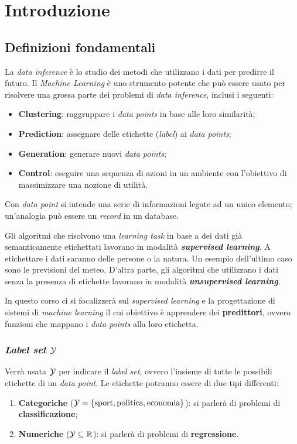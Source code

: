 \section{Introduzione}

\subsection{Definizioni fondamentali}

La \textit{data inference} è lo studio dei metodi che utilizzano i dati per predirre il futuro. 
Il \textit{Machine Learning} è uno strumento potente che può essere usato per risolvere una 
grossa parte dei problemi di \textit{data inference}, inclusi i seguenti:
\begin{itemize}
    \item \textbf{Clustering}: raggruppare i \textit{data points} in base alle loro similarità;
    \item \textbf{Prediction}: assegnare delle etichette (\textit{label}) ai \textit{data points};
    \item \textbf{Generation}: generare nuovi \textit{data points};
    \item    \textbf{Control}: eseguire una sequenza di azioni in un ambiente con l'obiettivo di
                               massimizzare una nozione di utilità.
\end{itemize}

Con \textit{data point} si intende una serie di informazioni legate ad un unico elemento;
un'analogia può essere un \textit{record} in un database.

Gli algoritmi che risolvono una \textit{learning task} in base a dei dati già semanticamente
etichettati lavorano in modalità \textbf{\textit{supervised learning}}. A etichettare i dati
saranno delle persone o la natura. Un esempio dell'ultimo caso sono le previsioni del meteo. 
D'altra parte, gli algoritmi che utilizzano i dati senza la presenza di etichette lavorano in
modalità \textbf{\textit{unsupervised learning}}.

In questo corso ci si focalizzerà sul \textit{supervised learning} e la progettazione di 
sistemi di \textit{machine learning} il cui obiettivo è apprendere dei 
\textbf{predittori}, ovvero funzioni che mappano i \textit{data points} alla loro
etichetta.

\subsubsection{\textit{Label set} \texorpdfstring{$\mathcal{Y}$}{Y}}
Verrà usata $\mathcal{Y}$ per indicare il \textit{label set}, ovvero l'insieme di tutte le possibili
etichette di un \textit{data point}. Le etichette potranno essere di due tipi differenti:
\begin{enumerate}
    \item \textbf{Categoriche} ($\mathcal{Y} = \{ \text{sport},\text{politica},\text{economia}\}$):
        si parlerà di problemi di \textbf{classificazione};
    \item \textbf{Numeriche} ($\mathcal{Y} \subseteq \mathbb{R} $): 
        si parlerà di problemi di \textbf{regressione}.
\end{enumerate}

